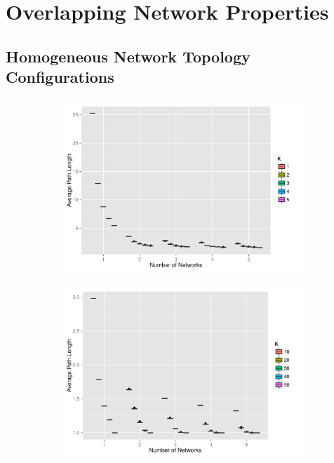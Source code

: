 
\renewcommand\thefigure{\thesection.\arabic{figure}}    
\setcounter{figure}{0}   

\renewcommand\thetable{\thesection.\arabic{table}}    
\setcounter{table}{0}     

\section{Overlapping Network Properties}

\subsection{Homogeneous Network Topology Configurations}
\begin{figure}[H]
\centering
\begin{subfigure}{.49\linewidth}
  \centering
 \includegraphics[width=1\linewidth]{"../analysis/pdf/network_properties_apl_kreg_12345"}
 \caption{}
 \label{append_fig:network_properties_apl_kreg_12345}
\end{subfigure}%
\begin{subfigure}{.49\linewidth}
  \centering
 \includegraphics[width=1\linewidth]{"../analysis/pdf/network_properties_apl_kreg_1020304050"}

\end{subfigure}
\end{figure}
